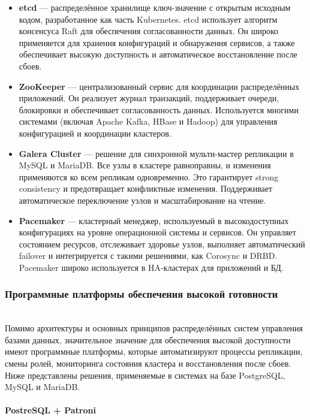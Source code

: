 \begin{itemize}
    \item \textbf{etcd} — распределённое хранилище ключ-значение с открытым исходным кодом, разработанное как часть Kubernetes. etcd использует алгоритм консенсуса Raft для обеспечения согласованности данных. Он широко применяется для хранения конфигураций и обнаружения сервисов, а также обеспечивает высокую доступность и автоматическое восстановление после сбоев. \autocite{Kleppmann}
    \item \textbf{ZooKeeper} — централизованный сервис для координации распределённых приложений. Он реализует журнал транзакций, поддерживает очереди, блокировки и обеспечивает согласованность данных. Используется многими системами (включая Apache Kafka, HBase и Hadoop) для управления конфигурацией и координации кластеров. \autocite{Kleppmann}
    \item \textbf{Galera Cluster} — решение для синхронной мульти-мастер репликации в MySQL и MariaDB. Все узлы в кластере равноправны, и изменения применяются ко всем репликам одновременно. Это гарантирует strong consistency и предотвращает конфликтные изменения. Поддерживает автоматическое переключение узлов и масштабирование на чтение. \autocite{GaleraCl}
    \item \textbf{Pacemaker} — кластерный менеджер, используемый в высокодоступных конфигурациях на уровне операционной системы и сервисов. Он управляет состоянием ресурсов, отслеживает здоровье узлов, выполняет автоматический failover и интегрируется с такими решениями, как Corosync и DRBD. Pacemaker широко используется в HA-кластерах для приложений и БД. \autocite{Sosemkaram}
\end{itemize}


\subsubsection{Программные платформы обеспечения высокой готовности} ~\\

Помимо архитектуры и основных принципов распределённых систем управления базами данных, значительное значение для обеспечения высокой доступности имеют программные платформы, которые автоматизируют процессы репликации, смены ролей, мониторинга состояния кластера и восстановления после сбоев. Ниже представлены решения, применяемые в системах на базе PostgreSQL, MySQL и MariaDB.

\paragraph{PostreSQL + Patroni} ~\\

